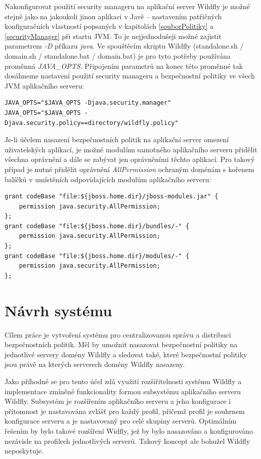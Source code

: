 Nakonfigurovat použití security manageru na aplikační server Wildfly je možné stejně jako na jakoukoli jinou aplikaci v Javě -- nastavením patřičných konfiguračních vlastností popsaných v kapitolách \ref{souborPolitiky} a \ref{securityManager} při startu JVM. To je nejjednodušeji možné zajistit parametrem {\it -D} příkazu {\it java}. Ve spouštěcím skriptu Wildfly (standalone.sh / domain.sh / standalone.bat / domain.bat) je pro tyto potřeby používána proměnná {\it JAVA\_OPTS}. Připojením parametrů na konec této proměnné tak dosáhneme nastavení použití security manageru a bezpečnostní politiky ve všech JVM aplikačního serveru: \cite{jbossSecurityManager}

\begin{verbatim}
JAVA_OPTS="$JAVA_OPTS -Djava.security.manager"
JAVA_OPTS="$JAVA_OPTS -Djava.security.policy==directory/wildfly.policy"
\end{verbatim}

Je-li účelem nasazení bezpečnostních politik na aplikační server omezení uživatelských aplikací, je možné modulům samotného aplikačního serveru přidělit všechna oprávnění a dále se zabývat jen oprávněními těchto aplikací. Pro takový případ je nutné přidělit oprávnění {\it AllPermission} ochraným doménám s kořenem balíčků v umístěních odpovídajících modulům aplikačního serveru:

\begin{verbatim}
grant codeBase "file:${jboss.home.dir}/jboss-modules.jar" {
    permission java.security.AllPermission;
};
grant codeBase "file:${jboss.home.dir}/bundles/-" {
    permission java.security.AllPermission;
};
grant codeBase "file:${jboss.home.dir}/modules/-" {
    permission java.security.AllPermission;
};
\end{verbatim}


\chapter{Návrh systému}

Cílem práce je vytvoření systému pro centralizovanou správu a distribuci bezpečnostních politik. Měl by umožnit nasazovat bezpečnostní politiky na jednotlivé servery domény Wildfly a sledovat také, které bezpečnostní politiky jsou právě na kterých serverech domény Wildfly nasazeny.

Jako příhodné se pro tento účel zdá využití rozšiřitelnosti systému Wildfly a implementace zmíněné funkcionality formou subsystému aplikačního serveru Wildfly. Subsystém je rozšířením aplikačního serveru a jeho konfigurace i přítomnost je nastavována zvlášť pro každý profil, přičemž profil je souhrnem konfigurace serveru a je nastavovaný pro celé skupiny serverů. Optimálním řešením by bylo takové rozšíření Widfly, jež by bylo nasazováno a konfigurováno nezávisle na profilech jednotlivých serverů. Takový koncept ale bohužel Wildfly neposkytuje.

